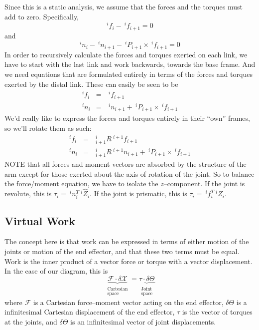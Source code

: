 \documentclass[]{article}
\begin{document}
Since this is a static analysis, we assume that the forces and the torques must add to zero. Specifically,
\begin{displaymath}
^{i}f_{i} - \ \!^{i}f_{i+1} = 0
\end{displaymath}
and
\begin{displaymath}
^{i}n_{i} - \ \!^{i}n_{i+1} - \ \!^{i}P_{i+1} \times \ \!^{i}f_{i+1} = 0
\end{displaymath}
In order to recursively calculate the forces and torques exerted on each link, we have to start with the last link and work backwards, towards the base frame. And we need equations that are formulated entirely in terms of the forces and torques exerted by the distal link. These can easily be seen to be
\begin{eqnarray}
^{i}f_{i} & = & \ \!^{i}f_{i+1} \\
^{i}n_{i} & = & \ \!^{i}n_{i+1} + \ \!^{i}P_{i+1} \times \ \!^{i}f_{i+1}
\end{eqnarray}
We'd really like to express the forces and torques entirely in their ``own'' frames, so we'll rotate them as such:
\begin{eqnarray}
^{i}f_{i} & = & \ \!^{i}_{i+1}R\ \!^{i+1}f_{i+1} \\
^{i}n_{i} & = &  \ \!^{i}_{i+1}R\ \!^{i+1}n_{i+1} + \ \!^{i}P_{i+1} \times \ \!^{i}f_{i+1}
\end{eqnarray}
NOTE that all forces and moment vectors are absorbed by the structure of the arm except for those exerted about the axis of rotation of the joint. So to balance the force/moment equation, we have to isolate the $z$--component. If the joint is revolute, this is $\tau_{i} = \ \!^{i}n_{i}^{T}\ \!^{i}\hat{Z}_{i}$. If the joint is prismatic, this is $\tau_{i} = \ \!^{i}f_{i}^{T}\ \!^{i}\hat{Z}_{i}$.

\subsection{Virtual Work}
The concept here is that work can be expressed in terms of either motion of the joints or motion of the end effector, and that these two terms must be equal. Work is the inner product of a vector force or torque with a vector displacement. In the case of our diagram, this is
\begin{displaymath}
	\underbrace{\mathcal{F} \cdot \delta\mathcal{X}}_{\substack{\text{Cartesian}\\\text{space}}} = \underbrace{\tau \cdot \delta\Theta}_{\substack{\text{Joint}\\ \text{space}}}
\end{displaymath}
where $\mathcal{F}$ is a Cartesian force--moment vector acting on the end effector, $\delta\Theta$ is a infinitesimal Cartesian displacement of the end effector, $\tau$ is the vector of torques at the joints, and $\delta \Theta$ is an infinitesimal vector of joint displacements.
\end{document}

